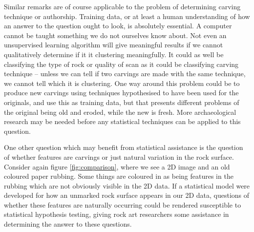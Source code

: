 \documentclass[a4paper,reqno,oneside]{amsart} %
\theoremstyle{definition}
\theoremstyle{remark}
\numberwithin{equation}{section}
\begin{document}
Similar remarks are of course applicable to the problem of determining carving technique or authorship. Training data, or at least a human understanding of how an answer to the question ought to look, is absolutely essential. A computer cannot be taught something we do not ourselves know about. Not even an unsupervised learning algorithm will give meaningful results if we cannot qualitatively determine if it it clustering meaningfully. It could as well be classifying the type of rock or quality of scan as it could be classifying carving technique -- unless we can tell if two carvings are made with the same technique, we cannot tell which it is clustering. One way around this problem could be to produce new carvings using techniques hypothesised to have been used for the originals, and use this as training data, but that presents different problems of the original being old and eroded, while the new is fresh. More archaeological research may be needed before any statistical techniques can be applied to this question.

One other question which may benefit from statistical assistance is the question of whether features are carvings or just natural variation in the rock surface. Consider again figure \ref{fig:comparison}, where we see a 2D image and an old coloured paper rubbing. Some things are coloured in as being features in the rubbing which are not obviously visible in the 2D data. If a statistical model were developed for how an unmarked rock surface appears in our 2D data, questions of whether these features are naturally occurring could be rendered susceptible to statistical hypothesis testing, giving rock art researchers some assistance in determining the answer to these questions.



\end{document}
